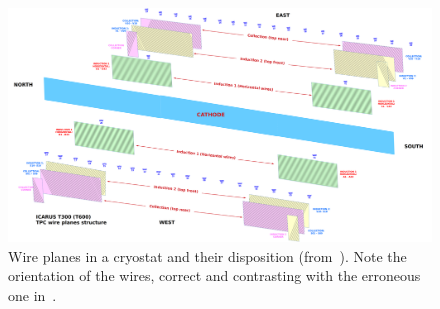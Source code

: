 \begin{figure}[p]
  \centerline{\includegraphics[width=0.90\textheight,angle=90]{figures/Icarus_TPC_wp}}
  \caption{
    Wire planes in a cryostat and their disposition (from~\cite{SBNDocDBxxxx:ConnTest}).
    Note the orientation of the wires, correct and contrasting with the erroneous one in~\cite{SBNDocDB1020}.
    \label{fig:WirePlanesInTPC}
  }
\end{figure}





